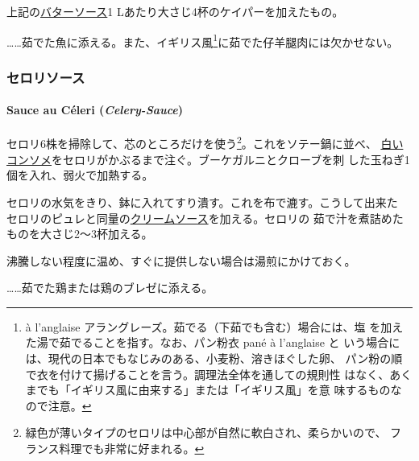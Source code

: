 \begin{recette}
上記の\protect\hyperlink{butter-sauce}{バターソース}1
Lあたり大さじ4杯のケイパーを加えたもの。

\ldots{}\ldots{}茹でた魚に添える。また、イギリス風\footnote{à l'anglaise
  アラングレーズ。茹でる（下茹でも含む）場合には、塩
  を加えた湯で茹でることを指す。なお、パン粉衣 pané à l'anglaise と
  いう場合には、現代の日本でもなじみのある、小麦粉、溶きほぐした卵、
  パン粉の順で衣を付けて揚げることを言う。調理法全体を通しての規則性
  はなく、あくまでも「イギリス風に由来する」または「イギリス風」を意
  味するものなので注意。}に茹でた仔羊腿肉には欠かせない。

\maeaki

\hypertarget{ux30bbux30edux30eaux30bdux30fcux30b9}{%
\subsubsection{セロリソース}\label{ux30bbux30edux30eaux30bdux30fcux30b9}}

\hypertarget{sauce-au-cuxe9leri-celery-sauce}{%
\paragraph{\texorpdfstring{Sauce au Céleri
(\emph{Celery-Sauce})}{Sauce au Céleri (Celery-Sauce)}}\label{sauce-au-cuxe9leri-celery-sauce}}


セロリ6株を掃除して、芯のところだけを使う\footnote{緑色が薄いタイプのセロリは中心部が自然に軟白され、柔らかいので、
  フランス料理でも非常に好まれる。}。これをソテー鍋に並べ、
\protect\hyperlink{}{白いコンソメ}をセロリがかぶるまで注ぐ。ブーケガルニとクローブを刺
した玉ねぎ1個を入れ、弱火で加熱する。

セロリの水気をきり、鉢に入れてすり潰す。これを布で漉す。こうして出来た
セロリのピュレと同量の\protect\hyperlink{cream-sauce}{クリームソース}を加える。セロリの
茹で汁を煮詰めたものを大さじ2〜3杯加える。

沸騰しない程度に温め、すぐに提供しない場合は湯煎にかけておく。

\ldots{}\ldots{}茹でた鶏または鶏のブレゼに添える。


\end{recette}
